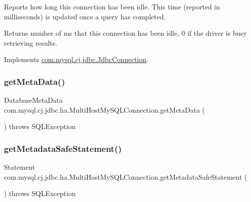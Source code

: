 Reports how long this connection has been idle. This time (reported in milliseconds) is updated once a query has completed.

\begin{DoxyReturn}{Returns}
number of ms that this connection has been idle, 0 if the driver is busy retrieving results. 
\end{DoxyReturn}


Implements \mbox{\hyperlink{interfacecom_1_1mysql_1_1cj_1_1jdbc_1_1_jdbc_connection_a3a242d2fb1e6c443f163d55f8bbd6cde}{com.\+mysql.\+cj.\+jdbc.\+Jdbc\+Connection}}.

\mbox{\label{classcom_1_1mysql_1_1cj_1_1jdbc_1_1ha_1_1_multi_host_my_s_q_l_connection_a43aceadcc65d836e90179a00f8b7af6c}} 
\subsubsection{\texorpdfstring{get\+Meta\+Data()}{getMetaData()}}
{\footnotesize\ttfamily Database\+Meta\+Data com.\+mysql.\+cj.\+jdbc.\+ha.\+Multi\+Host\+My\+S\+Q\+L\+Connection.\+get\+Meta\+Data (\begin{DoxyParamCaption}{ }\end{DoxyParamCaption}) throws S\+Q\+L\+Exception}

\mbox{\label{classcom_1_1mysql_1_1cj_1_1jdbc_1_1ha_1_1_multi_host_my_s_q_l_connection_a62f8f7a723023f9bcda91b16ea300a3c}} 
\subsubsection{\texorpdfstring{get\+Metadata\+Safe\+Statement()}{getMetadataSafeStatement()}}
{\footnotesize\ttfamily Statement com.\+mysql.\+cj.\+jdbc.\+ha.\+Multi\+Host\+My\+S\+Q\+L\+Connection.\+get\+Metadata\+Safe\+Statement (\begin{DoxyParamCaption}{ }\end{DoxyParamCaption}) throws S\+Q\+L\+Exception}



